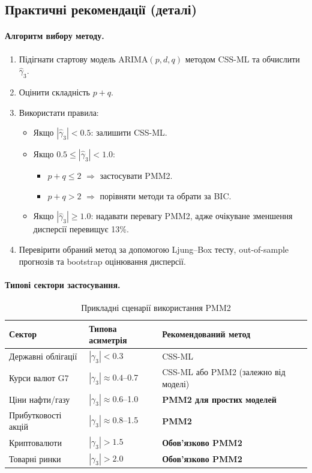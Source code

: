 \documentclass[12pt,a4paper]{article}
\begin{document}
\subsection{Практичні рекомендації (деталі)}
\label{app:wti_guidelines}

\paragraph{Алгоритм вибору методу.}
\begin{enumerate}
    \item Підігнати стартову модель ARIMA$(p,d,q)$ методом CSS-ML та обчислити $\hat{\gamma}_3$.
    \item Оцінити складність $p+q$.
    \item Використати правила:
    \begin{itemize}
        \item Якщо $|\hat{\gamma}_3| < 0.5$: залишити CSS-ML.
        \item Якщо $0.5 \leq |\hat{\gamma}_3| < 1.0$:
        \begin{itemize}
            \item $p+q \leq 2$ $\Rightarrow$ застосувати PMM2.
            \item $p+q > 2$ $\Rightarrow$ порівняти методи та обрати за BIC.
        \end{itemize}
        \item Якщо $|\hat{\gamma}_3| \geq 1.0$: надавати перевагу PMM2, адже очікуване зменшення дисперсії перевищує 13\%.
    \end{itemize}
    \item Перевірити обраний метод за допомогою Ljung--Box тесту, out-of-sample прогнозів та bootstrap оцінювання дисперсії.
\end{enumerate}

\paragraph{Типові сектори застосування.}
\begin{table}[htbp]
\centering
\caption{Прикладні сценарії використання PMM2}
\label{tab:wti_sector_recommendations}
\begin{tabular}{@{}lll@{}}
\toprule
\textbf{Сектор} & \textbf{Типова асиметрія} & \textbf{Рекомендований метод} \\
\midrule
Державні облігації & $|\gamma_3| < 0.3$ & CSS-ML \\
Курси валют G7 & $|\gamma_3| \approx 0.4$--0.7 & CSS-ML або PMM2 (залежно від моделі) \\
Ціни нафти/газу & $|\gamma_3| \approx 0.6$--1.0 & \textbf{PMM2 для простих моделей} \\
Прибутковості акцій & $|\gamma_3| \approx 0.8$--1.5 & \textbf{PMM2} \\
Криптовалюти & $|\gamma_3| > 1.5$ & \textbf{Обов'язково PMM2} \\
Товарні ринки & $|\gamma_3| > 2.0$ & \textbf{Обов'язково PMM2} \\
\bottomrule
\end{tabular}
\end{table}
\end{document}

